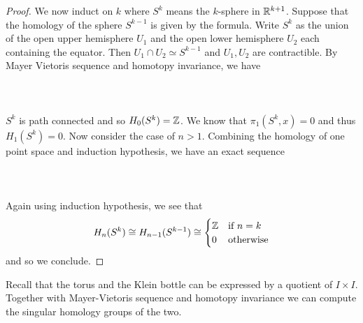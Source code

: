 \documentclass[a4paper]{article}
\begin{document}
\begin{thm}{}{}
\begin{proof}
We now induct on $k$ where $S^k$ means the $k$-sphere in $\mathbb{R}^{k+1}$. Suppose that the homology of the sphere $S^{k-1}$ is given by the formula. Write $S^k$ as the union of the open upper hemisphere $U_1$ and the open lower hemisphere $U_2$ each containing the equator. Then $U_1\cap U_2\simeq S^{k-1}$ and $U_1,U_2$ are contractible. By Mayer Vietoris sequence and homotopy invariance, we have \\~\\
\\~\\
$S^k$ is path connected and so $H_0(S^k)=\mathbb{Z}$. We know that $\pi_1(S^k,x)=0$ and thus $H_1(S^k)=0$. Now consider the case of $n>1$. Combining the homology of one point space and induction hypothesis, we have an exact sequence \\~\\
\\~\\
Again using induction hypothesis, we see that $$H_n(S^k)\cong H_{n-1}(S^{k-1})\cong\begin{cases}
\mathbb{Z} & \text{if } n=k\\
0 & \text{otherwise}
\end{cases}$$
and so we conclude. 
\end{proof}
\end{thm}

Recall that the torus and the Klein bottle can be expressed by a quotient of $I\times I$. Together with Mayer-Vietoris sequence and homotopy invariance we can compute the singular homology groups of the two. 
\end{document}

